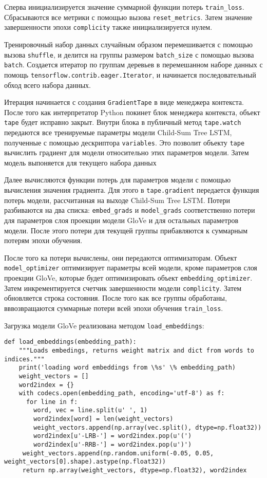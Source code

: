Сперва инициализируется значение суммарной функции потерь \texttt{tra\-in\_loss}. Сбрасываются все метрики с помощью вызова \texttt{reset\_metrics}. Затем значение завершенности эпохи \texttt{complicity} также инициализируется нулем.

Тренировочный набор данных случайным образом перемешивается с помощью вызова \texttt{shuffle}, и делится на группы размером \texttt{batch\_size} с помощью вызова \texttt{batch}. Создается итератор по группам деревьев в перемешанном наборе данных с помощь \texttt{tensorflow.contrib.eager.Itera\-tor}, и начинается последовательный обход всего набора данных.

Итерация начинается с создания \texttt{GradientTape} в виде менеджера контекста. После того как интерпретатор Python покинет блок менеджера контекста, объект \texttt{tape} будет исправно закрыт. Внутри блока в публичный метод \texttt{tape.watch} передаются все тренируемые параметры модели Child-Sum Tree LSTM\@, полученные с помощью дескриптора \texttt{variables}. Это позволит объекту \texttt{tape} вычислить градиент для модели относительно этих параметров модели. Затем модель выпоняется для текущего набора данных

Далее вычисляются функции потерь для параметров модели с помощью вычисления значения градиента. Для этого в \texttt{tape.gradient} передается функция потерь модели, рассчитанная на выходе Child-Sum Tree LSTM\@. Потери разбиваются на два списка: \texttt{embed\_grads} и \texttt{model\_grads} соответственно потери для параметров слоя проекции модели GloVe и для остальных параметров модели. После этого потери для текущей группы прибавляются к суммарным потерям эпохи обучения.

После того ка потери вычислены, они передаются оптимизаторам. Объект \texttt{model\_optimizer} оптимизирует параметры всей модели, кроме параметров слоя проекции GloVe, которые будет оптимизировать объект \texttt{embed\-ding\_optimizer}. Затем инкрементируется счетчик завершенности модели \texttt{complicity}. Затем обновляется строка состояния. После того как все группы обработаны, вввозвращаются суммарные потери всей эпохи обучения \texttt{train\_loss}.

Загрузка модели GloVe реализована методом \texttt{load\_embeddings}:
\medskip
\begin{lstlisting}[style=Python]
  def load_embeddings(embedding_path):
    """Loads embedings, returns weight matrix and dict from words to indices."""
    print('loading word embeddings from \%s' \% embedding_path)
    weight_vectors = []
    word2index = {}
    with codecs.open(embedding_path, encoding='utf-8') as f:
      for line in f:
        word, vec = line.split(u' ', 1)
        word2index[word] = len(weight_vectors)
        weight_vectors.append(np.array(vec.split(), dtype=np.float32))
        word2index[u'-LRB-'] = word2index.pop(u'(')
        word2index[u'-RRB-'] = word2index.pop(u')')
     weight_vectors.append(np.random.uniform(-0.05, 0.05, weight_vectors[0].shape).astype(np.float32))
     return np.array(weight_vectors, dtype=np.float32), word2index
\end{lstlisting}
\medskip

